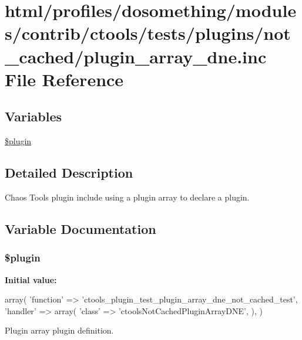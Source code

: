 \hypertarget{not__cached_2plugin__array__dne_8inc}{
\section{html/profiles/dosomething/modules/contrib/ctools/tests/plugins/not\_\-cached/plugin\_\-array\_\-dne.inc File Reference}
\label{not__cached_2plugin__array__dne_8inc}
}
\subsection*{Variables}
\begin{DoxyCompactItemize}
\item 
\hyperlink{not__cached_2plugin__array__dne_8inc_ada8a7130088351710bb02ed622d6bf65}{\$plugin}
\end{DoxyCompactItemize}


\subsection{Detailed Description}
Chaos Tools plugin include using a plugin array to declare a plugin. 

\subsection{Variable Documentation}
\hypertarget{not__cached_2plugin__array__dne_8inc_ada8a7130088351710bb02ed622d6bf65}{
\subsubsection[{\$plugin}]{\setlength{\rightskip}{0pt plus 5cm}\$plugin}}
\label{not__cached_2plugin__array__dne_8inc_ada8a7130088351710bb02ed622d6bf65}
{\bfseries Initial value:}
\begin{DoxyCode}
 array(
  'function' => 'ctools_plugin_test_plugin_array_dne_not_cached_test',
  'handler' => array(
    'class' => 'ctoolsNotCachedPluginArrayDNE',
  ),
)
\end{DoxyCode}
Plugin array plugin definition. 